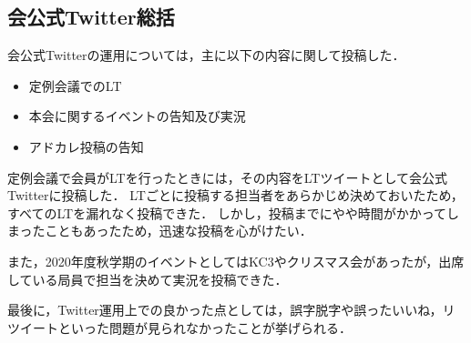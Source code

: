 \subsection*{会公式Twitter総括}



会公式Twitterの運用については，主に以下の内容に関して投稿した．

\begin{itemize}
\item 定例会議でのLT
\item 本会に関するイベントの告知及び実況
\item アドカレ投稿の告知
\end{itemize}


定例会議で会員がLTを行ったときには，その内容をLTツイートとして会公式Twitterに投稿した．
LTごとに投稿する担当者をあらかじめ決めておいたため，すべてのLTを漏れなく投稿できた．
しかし，投稿までにやや時間がかかってしまったこともあったため，迅速な投稿を心がけたい．

また，2020年度秋学期のイベントとしてはKC3やクリスマス会があったが，出席している局員で担当を決めて実況を投稿できた．

最後に，Twitter運用上での良かった点としては，誤字脱字や誤ったいいね，リツイートといった問題が見られなかったことが挙げられる．
